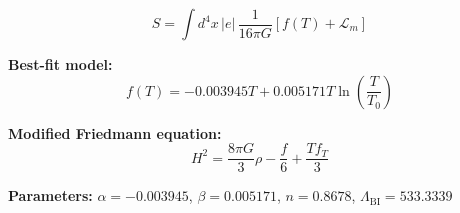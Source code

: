 
\begin{equation}
  S = \int d^4x \, |e| \, \frac{1}{16\pi G} \left[ f(T) + \mathcal{L}_m \right]
\end{equation}

\textbf{Best-fit model:}
\begin{equation}
  f(T) = -0.003945 T + 0.005171 T \ln\!\left(\frac{T}{T_0}\right)
\end{equation}

\textbf{Modified Friedmann equation:}
\begin{equation}
  H^2 = \frac{8\pi G}{3} \rho - \frac{f}{6} + \frac{T f_T}{3}
\end{equation}

\textbf{Parameters:}
$\alpha = -0.003945$, \quad
$\beta = 0.005171$, \quad
$n = 0.8678$, \quad
$\Lambda_{\text{BI}} = 533.3339$